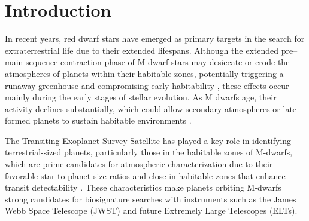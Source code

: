 
\section{Introduction}

In recent years, red dwarf stars have emerged as primary targets in the search for extraterrestrial life due to their extended lifespans. 
Although the extended pre–main-sequence contraction phase of M dwarf stars may desiccate or erode the atmospheres of planets within their habitable zones, potentially triggering a runaway greenhouse and compromising early habitability \citep{Luger.and.Barnes.2015AsBio..15..119L}, these effects occur mainly during the early stages of stellar evolution. As M dwarfs age, their activity declines substantially, which could allow secondary atmospheres or late-formed planets to sustain habitable environments \citep{Gale2017}.

The Transiting Exoplanet Survey Satellite \citep[TESS,][]{Ricker2015} has played a key role in identifying terrestrial-sized planets, particularly those in the habitable zones of M-dwarfs, which are prime candidates for atmospheric characterization due to their favorable star-to-planet size ratios and close-in habitable zones that enhance transit detectability \citep{Shields16}. These characteristics make planets orbiting M-dwarfs strong candidates for biosignature searches with instruments such as the James Webb Space Telescope (JWST) and future Extremely Large Telescopes (ELTs).

